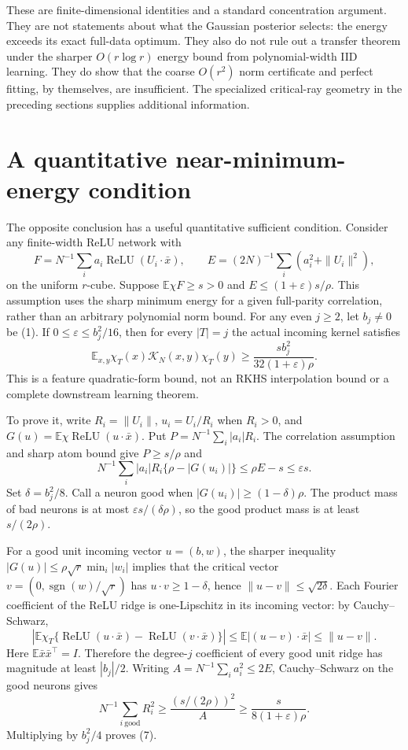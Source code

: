 \documentclass[11pt]{article}
\newcommand{\E}{\mathbb E}\newcommand{\R}{\mathbb R}
\newcommand{\relu}{\operatorname{ReLU}}\newcommand{\HH}{\mathcal H}
\begin{document}
These are finite-dimensional identities and a standard concentration
argument. They are not statements about what the Gaussian posterior
selects: the energy exceeds its exact full-data optimum.
They also do not rule out a transfer theorem under the sharper
$O(r\log r)$ energy bound from polynomial-width IID learning. They do
show that the coarse $O(r^2)$ norm certificate and perfect fitting,
by themselves, are insufficient. The specialized critical-ray geometry
in the preceding sections supplies additional information.

\section{A quantitative near-minimum-energy condition}
The opposite conclusion has a useful quantitative sufficient condition.
Consider any finite-width ReLU network with
\[
 F=N^{-1}\sum_i a_i\relu(U_i\cdot\bar x),\qquad
 E=(2N)^{-1}\sum_i(a_i^2+\|U_i\|^2),
\]
on the uniform $r$-cube. Suppose $\E\chi F\ge s>0$ and
$E\le(1+\varepsilon)s/\rho$. This assumption uses the sharp minimum
energy for a given full-parity correlation, rather than an arbitrary
polynomial norm bound. For any even $j\ge2$, let $b_j\ne0$ be (1).
If $0\le\varepsilon\le b_j^2/16$, then for every $|T|=j$ the actual
incoming kernel satisfies
\[
 \E_{x,y}\chi_T(x)\mathcal K_N(x,y)\chi_T(y)
       \ge\frac{s b_j^2}{32(1+\varepsilon)\rho}.           \tag{7}
\]
This is a feature quadratic-form bound, not an RKHS interpolation bound
or a complete downstream learning theorem.

To prove it, write $R_i=\|U_i\|$, $u_i=U_i/R_i$ when $R_i>0$,
and $G(u)=\E\chi\relu(u\cdot\bar x)$. Put
$P=N^{-1}\sum_i|a_i|R_i$. The correlation assumption and sharp atom
bound give $P\ge s/\rho$ and
\[
 N^{-1}\sum_i|a_i|R_i\{\rho-|G(u_i)|\}
                \le\rho E-s\le\varepsilon s.
\]
Set $\delta=b_j^2/8$. Call a neuron good when
$|G(u_i)|\ge(1-\delta)\rho$. The product mass of bad neurons is
at most $\varepsilon s/(\delta\rho)$, so the good product mass is
at least $s/(2\rho)$.

For a good unit incoming vector $u=(b,w)$, the sharper inequality
$|G(u)|\le\rho\sqrt r\min_i|w_i|$ implies that the critical vector
$v=(0,\operatorname{sgn}(w)/\sqrt r)$ has
$u\cdot v\ge1-\delta$, hence $\|u-v\|\le\sqrt{2\delta}$.
Each Fourier coefficient of the ReLU ridge is one-Lipschitz in its
incoming vector: by Cauchy--Schwarz,
\[
 \left|\E\chi_T\{\relu(u\cdot\bar x)-\relu(v\cdot\bar x)\}\right|
 \le\E|(u-v)\cdot\bar x|\le\|u-v\|.
\]
Here $\E\bar x\bar x^\top=I$. Therefore the degree-$j$ coefficient
of every good unit ridge has magnitude at least $|b_j|/2$.
Writing $A=N^{-1}\sum_i a_i^2\le2E$, Cauchy--Schwarz on the good
neurons gives
\[
 N^{-1}\sum_{i\ \mathrm{good}}R_i^2
 \ge\frac{(s/(2\rho))^2}{A}
 \ge\frac{s}{8(1+\varepsilon)\rho}.
\]
Multiplying by $b_j^2/4$ proves (7).
\end{document}
